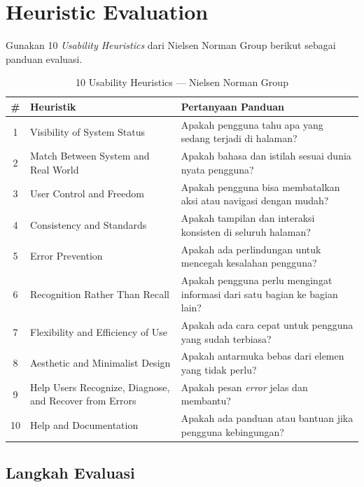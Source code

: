 \section{Heuristic Evaluation}
\label{sec:heuristic-evaluation}

Gunakan 10 \emph{Usability Heuristics} dari Nielsen Norman Group berikut sebagai panduan evaluasi.

\begin{table}[htbp]
\centering
\caption{10 Usability Heuristics --- Nielsen Norman Group}
\label{tab:heuristik-nng}
\small
\begin{tabular}{@{}clp{7cm}@{}}
\toprule
\textbf{\#} & \textbf{Heuristik} & \textbf{Pertanyaan Panduan} \\
\midrule
1 & Visibility of System Status & Apakah pengguna tahu apa yang sedang terjadi di halaman? \\
2 & Match Between System and Real World & Apakah bahasa dan istilah sesuai dunia nyata pengguna? \\
3 & User Control and Freedom & Apakah pengguna bisa membatalkan aksi atau navigasi dengan mudah? \\
4 & Consistency and Standards & Apakah tampilan dan interaksi konsisten di seluruh halaman? \\
5 & Error Prevention & Apakah ada perlindungan untuk mencegah kesalahan pengguna? \\
6 & Recognition Rather Than Recall & Apakah pengguna perlu mengingat informasi dari satu bagian ke bagian lain? \\
7 & Flexibility and Efficiency of Use & Apakah ada cara cepat untuk pengguna yang sudah terbiasa? \\
8 & Aesthetic and Minimalist Design & Apakah antarmuka bebas dari elemen yang tidak perlu? \\
9 & Help Users Recognize, Diagnose, and Recover from Errors & Apakah pesan \emph{error} jelas dan membantu? \\
10 & Help and Documentation & Apakah ada panduan atau bantuan jika pengguna kebingungan? \\
\bottomrule
\end{tabular}
\end{table}

\subsection{Langkah Evaluasi}
\label{subsec:langkah-evaluasi}

